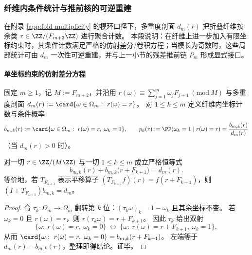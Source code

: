
\subsubsection{纤维内条件统计与推前核的可逆重建}\label{subsubsec:fold-fiber-conditional-statistics}
在附录 \ref{app:fold-multiplicity} 的模环口径下，多重度剖面 \(d_m(r)\) 把折叠纤维按余类 \(r\in\ZZ/(F_{m+2}\ZZ)\) 进行聚合计数。
本段说明：在纤维上进一步加入有限坐标约束时，其条件计数满足严格的仿射差分/卷积方程；当模长为奇数时，这些局部统计可由 \(d_m\) 一次性可逆重建，并与上一小节的残差推前链 \(P_m\) 形成显式接口。

\paragraph{单坐标约束的仿射差分方程}
固定 \(m\ge 1\)，记 \(M:=F_{m+2}\)，并沿用
\(
r(\omega)\equiv \sum_{j=1}^m \omega_jF_{j+1}\ (\mathrm{mod}\ M)
\)
与多重度剖面
\(
d_m(r):=\card\{\omega\in\Omega_m:\ r(\omega)=r\}
\)。
对 \(1\le k\le m\) 定义纤维内坐标计数与条件概率
\[
b_{m,k}(r):=\card\{\omega\in\Omega_m:\ r(\omega)=r,\ \omega_k=1\},
\qquad
p_k(r):=\PP(\omega_k=1\mid r(\omega)=r)=\frac{b_{m,k}(r)}{d_m(r)}
\]
（当 \(d_m(r)>0\) 时）。

\begin{proposition}[坐标翻转诱导的仿射差分方程]\label{prop:fold-fiber-single-coordinate-affine-difference}
对一切 \(r\in\ZZ/(M\ZZ)\) 与一切 \(1\le k\le m\) 成立严格恒等式
\[
\boxed{\;
b_{m,k}(r)+b_{m,k}\!\bigl(r+F_{k+1}\bigr)=d_m(r).\;}
\]
等价地，若 \(T_{F_{k+1}}\) 表示平移算子 \((T_{F_{k+1}}f)(r)=f(r+F_{k+1})\)，则
\(
(I+T_{F_{k+1}})b_{m,k}=d_m
\)。
\end{proposition}

\begin{proof}
令 \(\tau_k:\Omega_m\to\Omega_m\) 翻转第 \(k\) 位：\((\tau_k\omega)_k=1-\omega_k\) 且其余坐标不变。
若 \(\omega_k=0\) 且 \(r(\omega)=r\)，则 \(r(\tau_k\omega)=r+F_{k+1}\)。
因此 \(\tau_k\) 给出双射
\[
\{\omega:\ r(\omega)=r,\ \omega_k=0\}\ \longleftrightarrow\ \{\omega:\ r(\omega)=r+F_{k+1},\ \omega_k=1\},
\]
从而
\(
\card\{\omega:\ r(\omega)=r,\ \omega_k=0\}=b_{m,k}(r+F_{k+1})
\)。
左端等于 \(d_m(r)-b_{m,k}(r)\)，整理即得结论。证毕。
\end{proof}

